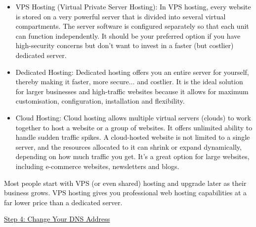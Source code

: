 \documentclass[12pt]{report}
\renewcommand{\_}{\kern-1.5pt\textunderscore\kern-1.5pt}
\begin{document}
\begin{itemize}
	\item {\fontsize{13pt}{15.6pt}\selectfont \textcolor[HTML]{0D0D0D}{VPS Hosting (Virtual Private Server Hosting): In VPS hosting, every website is stored on a very powerful server that is divided into several virtual compartments. The server software is configured separately so that each unit can function independently. It should be your preferred option if you have high-security concerns but don’t want to invest in a faster (but costlier) dedicated server.}\par}\par

	\item {\fontsize{13pt}{15.6pt}\selectfont \textcolor[HTML]{0D0D0D}{Dedicated Hosting: Dedicated hosting oﬀers you an entire server for yourself, thereby making it faster, more secure$ \ldots $ and costlier. It is the ideal solution for larger businesses and high-traﬃc websites because it allows for maximum customisation, configuration, installation and flexibility.}\par}\par

	\item {\fontsize{13pt}{15.6pt}\selectfont \textcolor[HTML]{0D0D0D}{Cloud Hosting: Cloud hosting allows multiple virtual servers (clouds) to work together to host a website or a group of websites. It oﬀers unlimited ability to handle sudden traﬃc spikes. A cloud-hosted website is not limited to a single server, and the resources allocated to it can shrink or expand dynamically, depending on how much traﬃc you get. It’s a great option for large websites, including e-commerce websites, newsletters and blogs.}\par}
\end{itemize}\par

\begin{adjustwidth}{1.18in}{0.57in}
 \tabto{0.59in} \textcolor[HTML]{0D0D0D}{Most people start with VPS (or even shared) hosting and upgrade later as their business grows. VPS hosting gives you professional web hosting capabilities at a far lower price than a dedicated server.}\par

\end{adjustwidth}


\vspace{\baselineskip}\begin{adjustwidth}{1.18in}{0.0in}
\textcolor[HTML]{0D0D0D}{\uline{Step 4: Change Your DNS Address}}\par

\end{adjustwidth}
\end{document}
